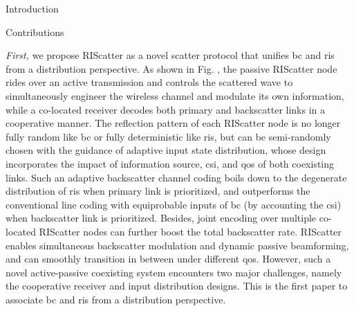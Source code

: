 \documentclass[journal]{IEEEtran}
\begin{document}
\begin{section}{Introduction}
\begin{subsection}{Contributions}

		\emph{First,} we propose RIScatter as a novel scatter protocol that unifies \gls{bc} and \gls{ris} from a distribution perspective.
		As shown in Fig. , the passive RIScatter node rides over an active transmission and controls the scattered wave to simultaneously engineer the wireless channel and modulate its own information, while a co-located receiver decodes both primary and backscatter links in a cooperative manner.
		The reflection pattern of each RIScatter node is no longer fully random like \gls{bc} or fully deterministic like \gls{ris}, but can be semi-randomly chosen with the guidance of adaptive input state distribution, whose design incorporates the impact of information source, \gls{csi}, and \gls{qos} of both coexisting links.
		Such an adaptive backscatter channel coding boils down to the degenerate distribution of \gls{ris} when primary link is prioritized, and outperforms the conventional line coding with equiprobable inputs of \gls{bc} (by accounting the \gls{csi}) when backscatter link is prioritized.
		Besides, joint encoding over multiple co-located RIScatter nodes can further boost the total backscatter rate.
		RIScatter enables simultaneous backscatter modulation and dynamic passive beamforming, and can smoothly transition in between under different \gls{qos}.
		However, such a novel active-passive coexisting system encounters two major challenges, namely the cooperative receiver and input distribution designs.
		This is the first paper to associate \gls{bc} and \gls{ris} from a distribution perspective.


\end{subsection}
\end{section}
\end{document}
